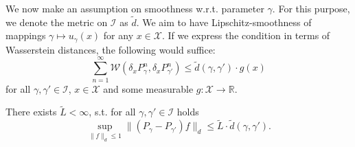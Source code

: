 We now make an assumption on smoothness w.r.t. parameter $\gamma$. For this purpose, we denote the metric on $\mathcal{I}$ as $\tilde{d}$.
We aim to have Lipschitz-smoothness of mappings $\gamma \mapsto u_{\gamma}(x)$ for any $x \in \mathcal{X}$. If we express the condition in terms of Wasserstein distances, the following would suffice:
    \[
        \sum_{n=1}^{\infty} \mathcal{W}(\delta_xP_{\gamma}^n, \delta_xP_{\gamma'}^n) \leq \tilde{d}(\gamma, \gamma') \cdot g(x)
    \]
    for all $\gamma, \gamma' \in \mathcal{I}$, $x \in \mathcal{X}$ and some measurable $g \colon \mathcal{X} \to \mathbb{R}$. 
\begin{assumption}
\label{a:gamma-lipshitz}
    There exists $\tilde{L} < \infty$, s.t. for all  $\gamma, \gamma' \in \mathcal{I}$ holds
    \[
    \sup_{\| f \|_d \leq 1} \| (P_{\gamma}-P_{\gamma'})f \|_d \leq \tilde{L} \cdot \tilde{d}(\gamma, \gamma').
    \]
\end{assumption}


